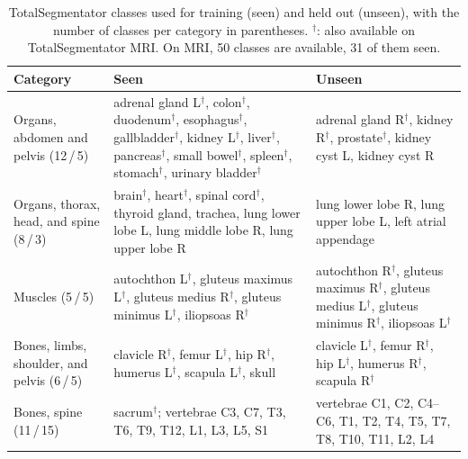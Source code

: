 \section*{}\label{sec:appendix}


\begin{table}[p]
  \centering
  \small
  \caption{TotalSegmentator classes used for training (seen) and held out
  (unseen), with the number of classes per category in parentheses.
  $^\dagger$: also available on TotalSegmentator MRI. On MRI, 50 classes are
  available, 31 of them seen.}
  \label{tab:totalseg-classes}
  \begin{tabularx}{\linewidth}{@{}p{3.2cm}XX@{}}
    \toprule
    Category & Seen & Unseen \\
    \midrule
    Organs, abdomen and pelvis (12\,/\,5)
      & adrenal gland L$^\dagger$, colon$^\dagger$, duodenum$^\dagger$,
        esophagus$^\dagger$, gallbladder$^\dagger$, kidney L$^\dagger$,
        liver$^\dagger$, pancreas$^\dagger$, small bowel$^\dagger$,
        spleen$^\dagger$, stomach$^\dagger$, urinary bladder$^\dagger$
      & adrenal gland R$^\dagger$, kidney R$^\dagger$, prostate$^\dagger$,
        kidney cyst L, kidney cyst R \\
    \addlinespace
    Organs, thorax, head, and spine (8\,/\,3)
      & brain$^\dagger$, heart$^\dagger$, spinal cord$^\dagger$, thyroid
        gland, trachea, lung lower lobe L, lung middle lobe R, lung upper
        lobe R
      & lung lower lobe R, lung upper lobe L, left atrial appendage \\
    \addlinespace
    Muscles (5\,/\,5)
      & autochthon L$^\dagger$, gluteus maximus L$^\dagger$, gluteus medius
        R$^\dagger$, gluteus minimus L$^\dagger$, iliopsoas R$^\dagger$
      & autochthon R$^\dagger$, gluteus maximus R$^\dagger$, gluteus medius
        L$^\dagger$, gluteus minimus R$^\dagger$, iliopsoas L$^\dagger$ \\
    \addlinespace
    Bones, limbs, shoulder, and pelvis (6\,/\,5)
      & clavicle R$^\dagger$, femur L$^\dagger$, hip R$^\dagger$, humerus
        L$^\dagger$, scapula L$^\dagger$, skull
      & clavicle L$^\dagger$, femur R$^\dagger$, hip L$^\dagger$, humerus
        R$^\dagger$, scapula R$^\dagger$ \\
    \addlinespace
    Bones, spine (11\,/\,15)
      & sacrum$^\dagger$; vertebrae C3, C7, T3, T6, T9, T12, L1, L3, L5, S1
      & vertebrae C1, C2, C4--C6, T1, T2, T4, T5, T7, T8, T10, T11, L2, L4 \\

\end{tabularx}
\end{table}
